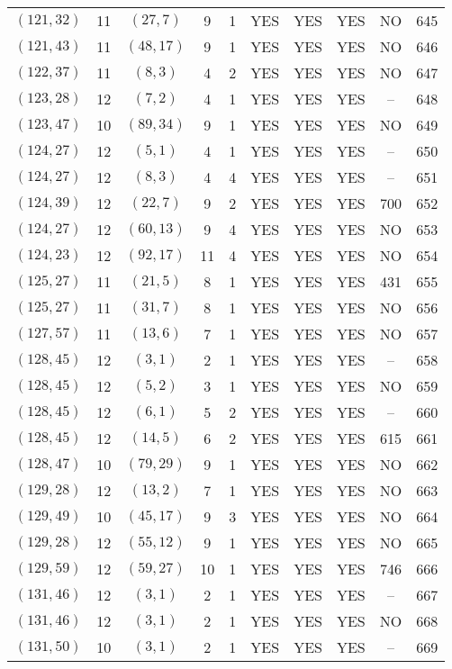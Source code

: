 \begin{longtable}{|c|c|c|c|c|c|c|c|c|c|}
$(121, 32)$ & 11 & $(27, 7)$ & 9 & 1 & YES & YES & YES & NO & 645\\
$(121, 43)$ & 11 & $(48, 17)$ & 9 & 1 & YES & YES & YES & NO & 646\\
$(122, 37)$ & 11 & $(8, 3)$ & 4 & 2 & YES & YES & YES & NO & 647\\
$(123, 28)$ & 12 & $(7, 2)$ & 4 & 1 & YES & YES & YES & -- & 648\\
$(123, 47)$ & 10 & $(89, 34)$ & 9 & 1 & YES & YES & YES & NO & 649\\
$(124, 27)$ & 12 & $(5, 1)$ & 4 & 1 & YES & YES & YES & -- & 650\\
$(124, 27)$ & 12 & $(8, 3)$ & 4 & 4 & YES & YES & YES & -- & 651\\
$(124, 39)$ & 12 & $(22, 7)$ & 9 & 2 & YES & YES & YES & 700 & 652\\
$(124, 27)$ & 12 & $(60, 13)$ & 9 & 4 & YES & YES & YES & NO & 653\\
$(124, 23)$ & 12 & $(92, 17)$ & 11 & 4 & YES & YES & YES & NO & 654\\
$(125, 27)$ & 11 & $(21, 5)$ & 8 & 1 & YES & YES & YES & 431 & 655\\
$(125, 27)$ & 11 & $(31, 7)$ & 8 & 1 & YES & YES & YES & NO & 656\\
$(127, 57)$ & 11 & $(13, 6)$ & 7 & 1 & YES & YES & YES & NO & 657\\
$(128, 45)$ & 12 & $(3, 1)$ & 2 & 1 & YES & YES & YES & -- & 658\\
$(128, 45)$ & 12 & $(5, 2)$ & 3 & 1 & YES & YES & YES & NO & 659\\
$(128, 45)$ & 12 & $(6, 1)$ & 5 & 2 & YES & YES & YES & -- & 660\\
$(128, 45)$ & 12 & $(14, 5)$ & 6 & 2 & YES & YES & YES & 615 & 661\\
$(128, 47)$ & 10 & $(79, 29)$ & 9 & 1 & YES & YES & YES & NO & 662\\
$(129, 28)$ & 12 & $(13, 2)$ & 7 & 1 & YES & YES & YES & NO & 663\\
$(129, 49)$ & 10 & $(45, 17)$ & 9 & 3 & YES & YES & YES & NO & 664\\
$(129, 28)$ & 12 & $(55, 12)$ & 9 & 1 & YES & YES & YES & NO & 665\\
$(129, 59)$ & 12 & $(59, 27)$ & 10 & 1 & YES & YES & YES & 746 & 666\\
$(131, 46)$ & 12 & $(3, 1)$ & 2 & 1 & YES & YES & YES & -- & 667\\
$(131, 46)$ & 12 & $(3, 1)$ & 2 & 1 & YES & YES & YES & NO & 668\\
$(131, 50)$ & 10 & $(3, 1)$ & 2 & 1 & YES & YES & YES & -- & 669\\

\end{longtable}
